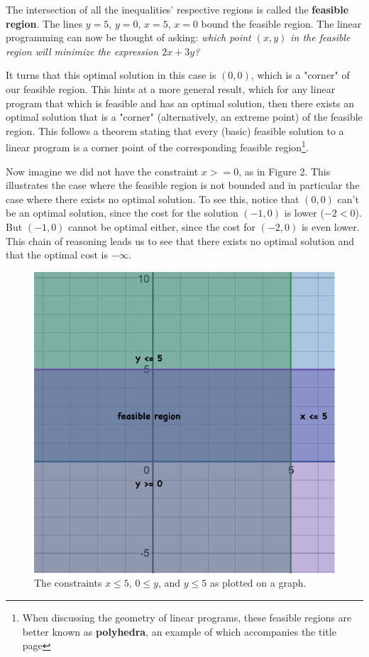\documentclass{paper}
\begin{document}
\medskip
The intersection of all the inequalities' respective regions is called the \textbf{feasible region}. The lines $y = 5$, $y = 0$, $x = 5$, $x = 0$ bound the feasible region. The linear programming can now be thought of asking: \textit{which point $(x, y)$ in the feasible region will minimize the expression $2x + 3y$?}

\medskip
It turns that this optimal solution in this case is $(0, 0)$, which is a "corner" of our feasible region. This hints at a more general result, which for any linear program that which is feasible and has an optimal solution, then there exists an optimal solution that is a "corner" (alternatively, an extreme point) of the feasible region. This follows a theorem stating that every (basic) feasible solution to a linear program is a corner point of the corresponding feasible region\footnote{When discussing the geometry of linear programs, these feasible regions are better known as \textbf{polyhedra}, an example of which accompanies the title page}.

\medskip
Now imagine we did not have the constraint $x >= 0$, as in Figure 2. This illustrates the case where the feasible region is not bounded and in particular the case where there exists no optimal solution. To see this, notice that $(0, 0)$ can't be an optimal solution, since the cost for the solution $(-1, 0)$ is lower ($-2 < 0$). But $(-1, 0)$ cannot be optimal either, since the cost for $(-2, 0)$ is even lower. This chain of reasoning leads us to see that there exists no optimal solution and that the optimal cost is $-\infty$.

\begin{figure}
    \centering
    \includegraphics[scale=0.4]{figure 2.png}
    \caption{The constraints $x \leq 5$, $0 \leq y$, and $y \leq 5$ as plotted on a graph.}
    \label{fig:my_label}
\end{figure}
\end{document}
